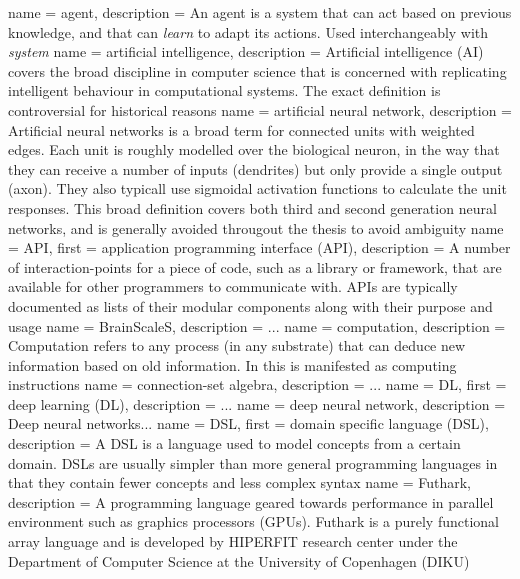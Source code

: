  {
  name = agent,
  description = {An agent is a system that can act based on previous knowledge,
		 and that can \textit{learn} to adapt its actions.
	         Used interchangeably with \textit{system}}
}
 {
    name = artificial intelligence,
    description = {Artificial intelligence (AI) covers the broad discipline in computer science
that is concerned with replicating intelligent behaviour in computational systems. The exact
definition is controversial for historical reasons \autocite{Nilsson2009}}
}
 {
  name = artificial neural network,
  description = {
    Artificial neural networks is a broad term for connected units with 
    weighted edges.
    Each unit is roughly modelled over the biological neuron, in the way 
    that they can receive a number of inputs (dendrites) 
    but only provide a single output (axon).
    They also typicall use sigmoidal activation functions to calculate the 
    unit responses.
    This broad definition covers both third and second generation neural
    networks, and is generally avoided througout the thesis to avoid 
    ambiguity}
}
 {
  name = API,
  first = {application programming interface (API)},
  description = {A number of interaction-points for a piece of code,
		 such as a library or framework, that are available for
		 other programmers to communicate with. APIs are typically
		 documented as lists of their modular components along
		 with their purpose and usage}
}
 {
  name = BrainScaleS,
  description = {...}
}
 {
   name = computation,
   description = {Computation refers to any process (in any
substrate) that can deduce new information based on old information. In
this is manifested as computing instructions}
}
 {
  name = {connection-set algebra},
  description = {...}
}
 {
  name = {DL},
  first = {deep learning (DL)},
  description = {...}
}
 {
  name = {deep neural network},
  description = {Deep neural networks...}
}
 {
  name = {DSL},
  first = {domain specific language (DSL)},
  description = {A DSL is a language used to model concepts from a certain
    domain. DSLs are usually simpler than more general programming languages in
    that they contain fewer concepts and less complex syntax}
}
 {
   name = {Futhark},
   description = {A programming language geared towards performance in parallel environment such as
   graphics processors (GPUs). Futhark is a purely functional array language and is
   developed by HIPERFIT research center under the Department of Computer Science at the
   University of Copenhagen (DIKU)}
}
